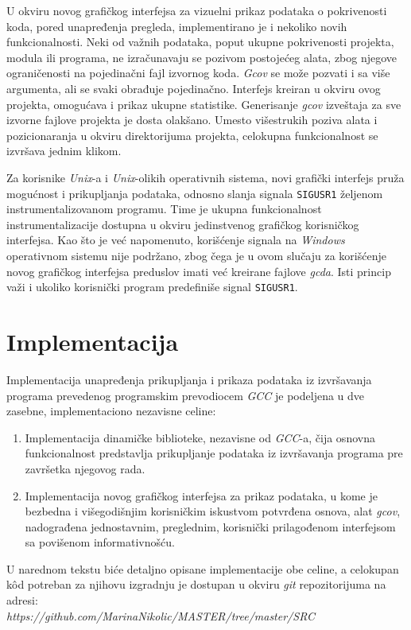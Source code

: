 \documentclass[12pt,oneside]{memoir}
\newcommand{\kod}[1]{\texttt{#1}}
\newcommand{\strano}[1]{\textit{#1}}
\begin{document}
U okviru novog grafičkog interfejsa za vizuelni prikaz podataka o pokrivenosti koda, pored unapređenja pregleda, implementirano je i nekoliko novih funkcionalnosti. Neki od važnih podataka, poput ukupne pokrivenosti projekta, modula ili programa, ne izračunavaju se pozivom postojećeg alata, zbog njegove ograničenosti na pojedinačni fajl izvornog koda. \strano{Gcov} se može pozvati i sa više argumenta, ali se svaki obrađuje pojedinačno. Interfejs kreiran u okviru ovog projekta, omogućava i prikaz ukupne statistike. Generisanje \strano{gcov} izveštaja za sve izvorne fajlove projekta je dosta olakšano. Umesto višestrukih poziva alata i pozicionaranja u okviru direktorijuma projekta, celokupna funkcionalnost se izvršava jednim klikom. 

Za korisnike \strano{Unix}-a i \strano{Unix}-olikih operativnih sistema, novi grafički interfejs pruža mogućnost i prikupljanja podataka, odnosno slanja signala \kod{SIGUSR1} željenom instrumentalizovanom programu. Time je ukupna funkcionalnost instrumentalizacije dostupna u okviru jedinstvenog grafičkog korisničkog interfejsa. Kao što je već napomenuto, korišćenje signala na \strano{Windows} operativnom sistemu nije podržano, zbog čega je u ovom slučaju za korišćenje novog grafičkog interfejsa preduslov imati već kreirane fajlove \strano{gcda}. Isti princip važi i ukoliko korisnički program predefiniše signal \kod{SIGUSR1}.

\chapter{Implementacija}
\label{chp:implementacija}

Implementacija unapređenja prikupljanja i prikaza podataka iz izvršavanja programa prevedenog programskim prevodiocem \strano{GCC} je podeljena u dve zasebne, implementaciono nezavisne celine:
\begin{enumerate}
\item Implementacija dinamičke biblioteke, nezavisne od \strano{GCC}-a, čija osnovna funkcionalnost predstavlja prikupljanje podataka iz izvršavanja programa pre završetka njegovog rada.
\item Implementacija novog grafičkog interfejsa za prikaz podataka, u kome je bezbedna i višegodišnjim korisničkim iskustvom potvrđena osnova, alat \strano{gcov}, nadograđena jednostavnim, preglednim, korisnički prilagođenom interfejsom sa povišenom informativnošću.
\end{enumerate}
U narednom tekstu biće detaljno opisane implementacije obe celine, a celokupan k\^{o}d potreban za njihovu izgradnju je dostupan u okviru \strano{git} repozitorijuma na adresi:\\
\strano{https://github.com/MarinaNikolic/MASTER/tree/master/SRC}
\end{document}
